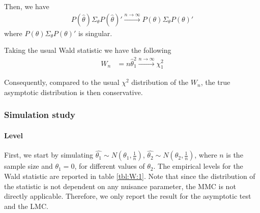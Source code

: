 \documentclass[]{article}\usepackage[]{graphicx}\usepackage[]{color}
\begin{document}
Then, we have
\begin{align}
	P(\hat{\theta})\Sigma_\theta P(\hat{\theta})'\xrightarrow{n \rightarrow \infty} P(\theta)\Sigma_\theta P(\theta)'
\end{align}
where $P(\theta)\Sigma_\theta P(\theta)'$ is singular.


Taking the usual Wald statistic we have the following
\begin{align}
	W_n & = n \hat{\theta}_1^2 \xrightarrow{n \rightarrow \infty} \chi^2_1
\end{align}

Consequently, compared to the usual $\chi^2$ distribution of the $W_n$, the true asymptotic distribution is then conservative.

\subsubsection{Simulation study}
\paragraph{Level}

First, we start by simulating $\hat{\theta_1} \sim N(\theta_1,\frac{1}{n})$, $\hat{\theta_2} \sim N(\theta_2,\frac{1}{n})$, where $n$ is the sample size and $\theta_1=0$, for different values of $\theta_2$. The empirical levels for the Wald statistic are reported in table \ref{tbl:W:1}. Note that since the distribution of the statistic is not dependent on any nuisance parameter, the MMC is not directly applicable. Therefore, we only report the result for the asymptotic test and the LMC.
\end{document}
